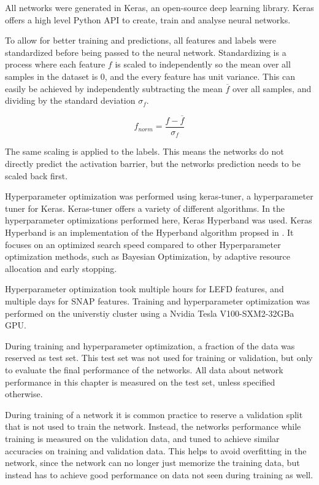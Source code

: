 All networks were generated in Keras, an open-source deep learning library.
Keras offers a high level Python API to create, train and analyse neural networks.

To allow for better training and predictions, all features and labels were standardized before being passed to the neural network.
Standardizing is a process where each feature $f$ is scaled to independently so the mean over all samples in the dataset is 0, 
and the every feature has unit variance.
This can easily be achieved by independently subtracting the mean $\overline{f}$ over all samples, and dividing by the standard deviation $\sigma_f$.

$$
f_{norm} = \frac{f- \overline{f}}{\sigma_f}
$$

The same scaling is applied to the labels.
This means the networks do not directly predict the activation barrier, but the networks prediction needs to be scaled back first.

Hyperparameter optimization was performed using keras-tuner, a hyperparameter tuner for Keras.
Keras-tuner offers a variety of different algorithms.
In the hyperparameter optimizations performed here, Keras Hyperband was used.
Keras Hyperband is an  implementation of the Hyperband algorithm propsed in \cite{li2017hyperband}.
It focuses on an optimized search speed compared to other Hyperparameter optimization methods, such as
Bayesian Optimization, by adaptive resource allocation and early stopping.

Hyperparameter optimization took multiple hours for LEFD features, 
and multiple days for SNAP features.
Training and hyperparameter optimization was performed on the universtiy cluster %
using a Nvidia Tesla V100-SXM2-32GBa GPU.

During training and hyperparameter optimization, a fraction of the data was reserved as test set.
This test set was not used for training or validation, but only to evaluate the final performance of the networks.
All data about network performance in this chapter is measured on the test set, unless specified otherwise.

During training of a network it is common practice to reserve a validation split that is not used to train the network.
Instead, the networks performance while training is measured on the validation data, and tuned to achieve similar accuracies on
training and validation data.
This helps to avoid overfitting in the network, since the network can no longer just memorize the training
data, but instead has to achieve good performance on data not seen during training as well.

